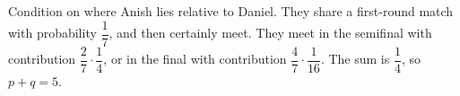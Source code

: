 Condition on where Anish lies relative to Daniel. They share a first-round match with probability $\dfrac{1}{7}$, and then certainly meet. They meet in the semifinal with contribution $\dfrac{2}{7}\cdot\dfrac{1}{4}$, or in the final with contribution $\dfrac{4}{7}\cdot\dfrac{1}{16}$. The sum is $\dfrac{1}{4}$, so $p+q=\boxed5$.
